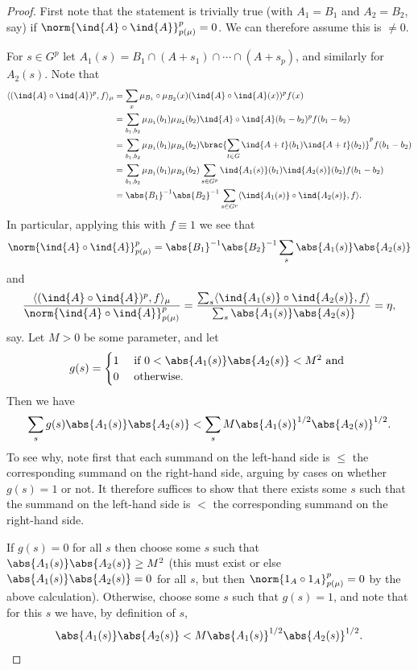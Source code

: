 \begin{proof}
\leanok
First note that the statement is trivially true (with $A_1=B_1$ and $A_2=B_2$, say) if $\norm{\ind{A}\circ \ind{A}}_{p(\mu)}^p=0$. We can therefore assume this is $\neq 0$.

For $s\in G^{p}$ let $A_1(s)=B_1\cap (A+s_1)\cap\cdots\cap (A+s_{p})$, and similarly for $A_2(s)$. Note that
\begin{align*}
\langle (\ind{A}\circ \ind{A})^p, f\rangle_\mu
&=\sum_{x} \mu_{B_1}\circ \mu_{B_2}(x)(\ind{A}\circ \ind{A}(x))^pf(x)\\
&=\sum_{b_1,b_2}\mu_{B_1}(b_1)\mu_{B_2}(b_2)\ind{A}\circ \ind{A}(b_1-b_2)^{p}f(b_1-b_2)\\
&=\sum_{b_1,b_2}\mu_{B_1}(b_1)\mu_{B_2}(b_2)\brac{\sum_{t\in G}\ind{A+t}(b_1)\ind{A+t}(b_2)}^{p}f(b_1-b_2)\\
&=\sum_{b_1,b_2}\mu_{B_1}(b_1)\mu_{B_2}(b_2)\sum_{s\in G^p}\ind{A_1(s)}(b_1)\ind{A_2(s)}(b_2)f(b_1-b_2)\\
&=\abs{B_1}^{-1}\abs{B_2}^{-1}\sum_{s\in G^p}\langle \ind{A_1(s)}\circ \ind{A_2(s)}, f\rangle.
\end{align*}
In particular, applying this with $f\equiv 1$ we see that
\[\norm{\ind{A}\circ \ind{A}}_{p(\mu)}^p=\abs{B_1}^{-1}\abs{B_2}^{-1}\sum_s\abs{A_1(s)}\abs{A_2(s)}\]
and
\[\frac{\langle (\ind{A}\circ \ind{A})^p,f\rangle_\mu}{\norm{\ind{A}\circ \ind{A}}_{p(\mu)}^p}=\frac{\sum_{s}\langle \ind{A_1(s)}\circ \ind{A_2(s)}, f\rangle}{\sum_s \abs{A_1(s)}\abs{A_2(s)}}=\eta,\]
say. Let $M>0$ be some parameter, and let
\[g(s) = \begin{cases} 1&\textrm{ if }0<\abs{A_1(s)}\abs{A_2(s)}<M^2\textrm{ and }\\0&\textrm{ otherwise.}\end{cases}\]
Then we have
\[\sum_s g(s)\abs{A_1(s)}\abs{A_2(s)}
<\sum_s M\abs{A_1(s)}^{1/2}\abs{A_2(s)}^{1/2}.\]
To see why, note first that each summand on the left-hand side is $\leq$ the corresponding summand on the right-hand side, arguing by cases on whether $g(s)=1$ or not. It therefore suffices to show that there exists some $s$ such that the summand on the left-hand side is $<$ the corresponding summand on the right-hand side.

If $g(s)=0$ for all $s$ then choose some $s$ such that $\abs{A_1(s)}\abs{A_2(s)}\geq M^2$ (this must exist or else $\abs{A_1(s)}\abs{A_2(s)}=0$ for all $s$, but then $\norm{1_A\circ 1_A}_{p(\mu)}^p=0$ by the above calculation). Otherwise, choose some $s$ such that $g(s)=1$, and note that for this $s$ we have, by definition of $s$,
\[\abs{A_1(s)}\abs{A_2(s)}<M\abs{A_1(s)}^{1/2}\abs{A_2(s)}^{1/2}.\]


\end{proof}
